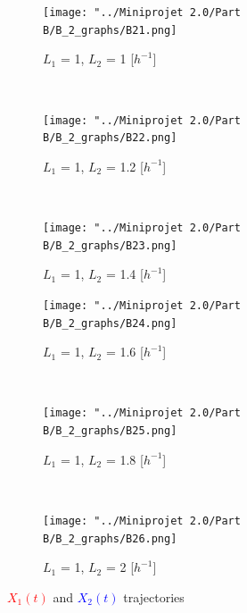 \documentclass[10pt,a4paper,oneside,twocolumn]{article}
\newcommand{\red}[1]{\textcolor{red}{#1}}
\newcommand{\blue}[1]{\textcolor{blue}{#1}}
\numberwithin{equation}{section} %
\begin{document}
    \begin{figure}
    \centering
	\begin{subfigure}[b]{0.32\textwidth}
	    \texttt{[image: "../Miniprojet 2.0/Part B/B\_2\_graphs/B21.png]}
	    \caption{$L_1$ = 1, $L_2$ = 1 [$h^{-1}$]}
	\end{subfigure}
	~ 
	\begin{subfigure}[b]{0.32\textwidth}
	    \texttt{[image: "../Miniprojet 2.0/Part B/B\_2\_graphs/B22.png]}
	    \caption{$L_1$ = 1, $L_2$ = 1.2 [$h^{-1}$]}
	\end{subfigure}
	~ 
	\begin{subfigure}[b]{0.32\textwidth}
	    \texttt{[image: "../Miniprojet 2.0/Part B/B\_2\_graphs/B23.png]}
	    \caption{$L_1$ = 1, $L_2$ = 1.4 [$h^{-1}$]}
	\end{subfigure}
	 
	\begin{subfigure}[b]{0.32\textwidth}
	    \texttt{[image: "../Miniprojet 2.0/Part B/B\_2\_graphs/B24.png]}
	    \caption{$L_1$ = 1, $L_2$ = 1.6 [$h^{-1}$]}
	\end{subfigure}
	~ 
	\begin{subfigure}[b]{0.32\textwidth}
	    \texttt{[image: "../Miniprojet 2.0/Part B/B\_2\_graphs/B25.png]}
	    \caption{$L_1$ = 1, $L_2$ = 1.8 [$h^{-1}$]}
	\end{subfigure}
	~ 
	\begin{subfigure}[b]{0.32\textwidth}
	    \texttt{[image: "../Miniprojet 2.0/Part B/B\_2\_graphs/B26.png]}
	    \caption{$L_1$ = 1, $L_2$ = 2 [$h^{-1}$]}
	\end{subfigure}

	\caption{\red{$X_1(t)$} and \blue{$X_2(t)$} trajectories}
    \end{figure}
\end{document}
